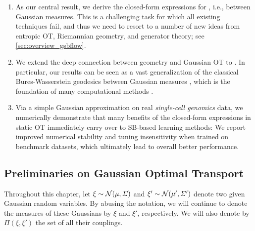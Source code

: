 \begin{enumerate}[leftmargin=.4cm,itemsep=.0cm,topsep=.0cm]
\item As our central result, we derive the closed-form expressions for , i.e.,  between Gaussian measures. This is a challenging task for which all existing techniques fail, and thus we need to resort to a number of new ideas from entropic \acrshort{OT}, Riemannian geometry, and generator theory; see \cref{sec:overview_gsbflow}.

\item We extend the deep connection between geometry and Gaussian \acrshort{OT} to . In particular, our results can be seen as a vast generalization of the classical Bures-Wasserstein geodesics between Gaussian measures \citep{takatsu2010wasserstein, bhatia2019bures}, which is the foundation of many computational methods \citep{chewi2020gradient, altschuler2021averaging, han2021riemannian}.

\item Via a simple Gaussian approximation on real \emph{single-cell genomics} data, we numerically demonstrate that many benefits of the closed-form expressions in static \acrshort{OT} immediately carry over to \acrshort{SB}-based learning methods: We report improved numerical stability and tuning insensitivity when trained on benchmark datasets, which ultimately lead to overall better performance.
\end{enumerate}

\subsection{Preliminaries on Gaussian Optimal Transport}
\label{sec:prelim_gsbflow}

Throughout this chapter, let $\xi \sim \mathcal{N}(\mu, \Sigma)$ and $\xi' \sim \mathcal{N}(\mu', \Sigma')$ denote two given Gaussian random variables. By abusing the notation, we will continue to denote the measures of these Gaussians by $\xi$ and $\xi'$, respectively. We will also denote by $\Pi(\xi,\xi')$ the set of all their couplings. 

